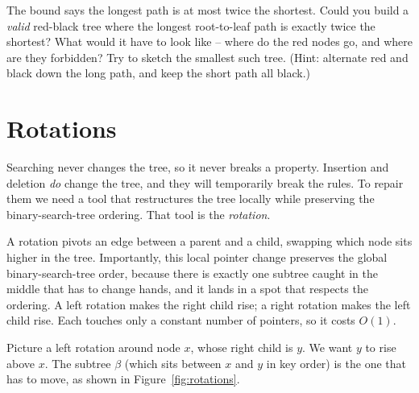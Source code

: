 \begin{walkbox}
The bound says the
longest path is at most twice the shortest. Could you build a \emph{valid}
red-black tree where the longest root-to-leaf path is exactly twice the shortest?
What would it have to look like -- where do the red nodes go, and where are they
forbidden? Try to sketch the smallest such tree. (Hint: alternate red and black
down the long path, and keep the short path all black.)
\end{walkbox}

\section{Rotations}\label{ch13:sec-rotations}

Searching never changes the tree, so it never breaks a property. Insertion and
deletion \emph{do} change the tree, and they will temporarily break the rules. To
repair them we need a tool that restructures the tree locally while preserving the
binary-search-tree ordering. That tool is the \emph{rotation}.

\begin{intuitionbox}
A rotation pivots an edge between a parent and a child, swapping which node sits
higher in the tree. Importantly, this local pointer change preserves the global
binary-search-tree order, because there is
exactly one subtree caught in the middle that has to change hands, and it lands in
a spot that respects the ordering. A left rotation makes the right child rise; a
right rotation makes the left child rise. Each touches only a constant number of
pointers, so it costs $O(1)$.
\end{intuitionbox}

Picture a left rotation around node $x$, whose right child is $y$. We want $y$ to
rise above $x$. The subtree $\beta$ (which sits between $x$ and $y$ in key order)
is the one that has to move, as shown in Figure~\ref{fig:rotations}.

